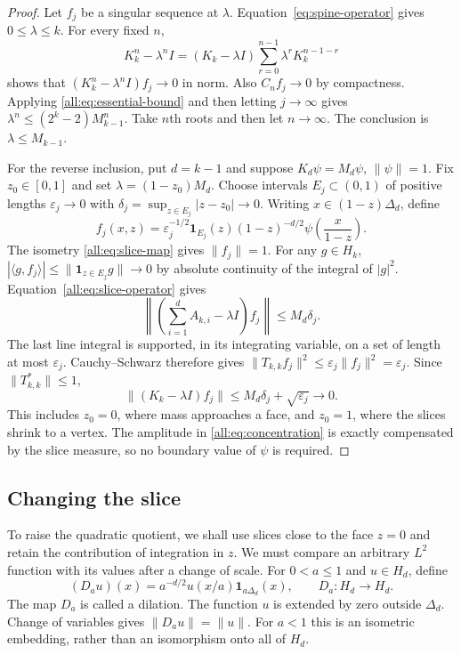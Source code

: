\documentclass[11pt]{article}
\begin{document}
\begin{proof}
Let $f_j$ be a singular sequence at $\lambda$.
Equation~\eqref{eq:spine-operator} gives $0\leq\lambda\leq k$.
For every fixed $n$,
\[
 K_k^n-\lambda^nI=(K_k-\lambda I)
                    \sum_{r=0}^{n-1}\lambda^rK_k^{n-1-r}
\]
shows that $(K_k^n-\lambda^nI)f_j\to0$ in norm.
Also $C_nf_j\to0$ by compactness.
Applying \eqref{all:eq:essential-bound} and then letting $j\to\infty$ gives
$\lambda^n\leq(2^k-2)M_{k-1}^n$.
Take $n$th roots and then let $n\to\infty$.
The conclusion is $\lambda\leq M_{k-1}$.

For the reverse inclusion, put $d=k-1$ and suppose
$K_d\psi=M_d\psi$, $\|\psi\|=1$.
Fix $z_0\in[0,1]$ and set $\lambda=(1-z_0)M_d$.
Choose intervals $E_j\subset(0,1)$ of positive lengths $\varepsilon_j\to0$
with $\delta_j=\sup_{z\in E_j}|z-z_0|\to0$.
Writing $x\in(1-z)\Delta_d$, define
\begin{equation}\label{all:eq:concentration}
 f_j(x,z)=\varepsilon_j^{-1/2}\mathbf1_{E_j}(z)
              (1-z)^{-d/2}\psi\left(\frac{x}{1-z}\right).
\end{equation}
The isometry \eqref{all:eq:slice-map} gives $\|f_j\|=1$.
For any $g\in H_k$,
$|\langle g,f_j\rangle|\leq\|\mathbf1_{z\in E_j}g\|\to0$
by absolute continuity of the integral of $|g|^2$.
Equation~\eqref{all:eq:slice-operator} gives
\[
 \left\|\left(\sum_{i=1}^{d}A_{k,i}-\lambda I\right)f_j\right\|
 \leq M_d\delta_j.
\]
The last line integral is supported, in its integrating variable, on a
set of length at most $\varepsilon_j$.
Cauchy--Schwarz therefore gives
$\|T_{k,k}f_j\|^2\leq\varepsilon_j\|f_j\|^2=\varepsilon_j$.
Since $\|T_{k,k}^*\|\leq1$,
\begin{equation}\label{all:eq:concentration-error}
 \|(K_k-\lambda I)f_j\|\leq M_d\delta_j+\sqrt{\varepsilon_j}\to0.
\end{equation}
This includes $z_0=0$, where mass approaches a face, and $z_0=1$,
where the slices shrink to a vertex.
The amplitude in \eqref{all:eq:concentration} is exactly compensated by the
slice measure, so no boundary value of $\psi$ is required.
\end{proof}

\subsection{Changing the slice}

To raise the quadratic quotient, we shall use slices close to the face
$z=0$ and retain the contribution of integration in $z$.
We must compare an arbitrary $L^2$ function with its values after a change
of scale.
For $0<a\leq1$ and $u\in H_d$, define
\begin{equation}\label{all:eq:dilation}
 (D_au)(x)=a^{-d/2}u(x/a)\mathbf1_{a\Delta_d}(x),\qquad D_a:H_d\to H_d.
\end{equation}
The map $D_a$ is called a dilation.
The function $u$ is extended by zero outside $\Delta_d$.
Change of variables gives $\|D_au\|=\|u\|$.
For $a<1$ this is an isometric embedding, rather than an isomorphism onto
all of $H_d$.
\end{document}
